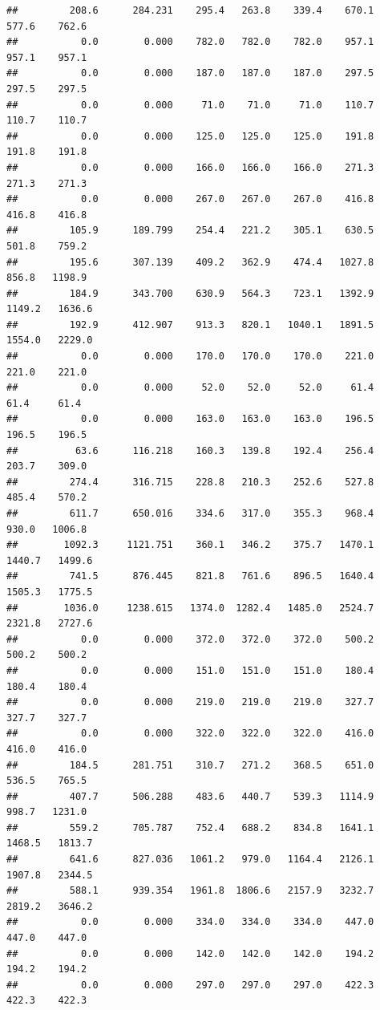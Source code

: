 \documentclass[
]{article}
\begin{document}
\begin{verbatim}
##         208.6      284.231    295.4   263.8    339.4    670.1    577.6    762.6
##           0.0        0.000    782.0   782.0    782.0    957.1    957.1    957.1
##           0.0        0.000    187.0   187.0    187.0    297.5    297.5    297.5
##           0.0        0.000     71.0    71.0     71.0    110.7    110.7    110.7
##           0.0        0.000    125.0   125.0    125.0    191.8    191.8    191.8
##           0.0        0.000    166.0   166.0    166.0    271.3    271.3    271.3
##           0.0        0.000    267.0   267.0    267.0    416.8    416.8    416.8
##         105.9      189.799    254.4   221.2    305.1    630.5    501.8    759.2
##         195.6      307.139    409.2   362.9    474.4   1027.8    856.8   1198.9
##         184.9      343.700    630.9   564.3    723.1   1392.9   1149.2   1636.6
##         192.9      412.907    913.3   820.1   1040.1   1891.5   1554.0   2229.0
##           0.0        0.000    170.0   170.0    170.0    221.0    221.0    221.0
##           0.0        0.000     52.0    52.0     52.0     61.4     61.4     61.4
##           0.0        0.000    163.0   163.0    163.0    196.5    196.5    196.5
##          63.6      116.218    160.3   139.8    192.4    256.4    203.7    309.0
##         274.4      316.715    228.8   210.3    252.6    527.8    485.4    570.2
##         611.7      650.016    334.6   317.0    355.3    968.4    930.0   1006.8
##        1092.3     1121.751    360.1   346.2    375.7   1470.1   1440.7   1499.6
##         741.5      876.445    821.8   761.6    896.5   1640.4   1505.3   1775.5
##        1036.0     1238.615   1374.0  1282.4   1485.0   2524.7   2321.8   2727.6
##           0.0        0.000    372.0   372.0    372.0    500.2    500.2    500.2
##           0.0        0.000    151.0   151.0    151.0    180.4    180.4    180.4
##           0.0        0.000    219.0   219.0    219.0    327.7    327.7    327.7
##           0.0        0.000    322.0   322.0    322.0    416.0    416.0    416.0
##         184.5      281.751    310.7   271.2    368.5    651.0    536.5    765.5
##         407.7      506.288    483.6   440.7    539.3   1114.9    998.7   1231.0
##         559.2      705.787    752.4   688.2    834.8   1641.1   1468.5   1813.7
##         641.6      827.036   1061.2   979.0   1164.4   2126.1   1907.8   2344.5
##         588.1      939.354   1961.8  1806.6   2157.9   3232.7   2819.2   3646.2
##           0.0        0.000    334.0   334.0    334.0    447.0    447.0    447.0
##           0.0        0.000    142.0   142.0    142.0    194.2    194.2    194.2
##           0.0        0.000    297.0   297.0    297.0    422.3    422.3    422.3

\end{verbatim}
\end{document}
